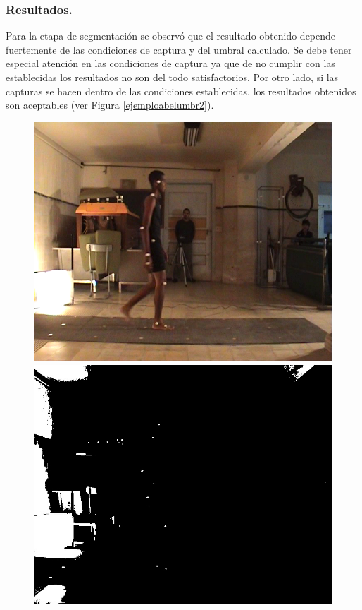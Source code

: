 \subsubsection{Resultados.}
Para la etapa de segmentación se observó que el resultado obtenido depende fuertemente de las condiciones de captura y del umbral calculado. Se debe tener especial atención en las condiciones de captura ya que de no cumplir con las establecidas los resultados no son del todo satisfactorios. Por otro lado, si las capturas se hacen dentro de las condiciones establecidas, los resultados obtenidos son aceptables (ver Figura \ref{ejemploabelumbr2}).
\vspace{-0.5cm}
\begin{figure}[ht!]
      \centering
        {\includegraphics[scale=0.10]{imagenes/abel_original_video.png}\label{abelvideo}}\hspace{1 mm}
        {\includegraphics[scale=0.10]{imagenes/abel_original_filtro.png}\label{abelfiltro}}

\end{figure}
